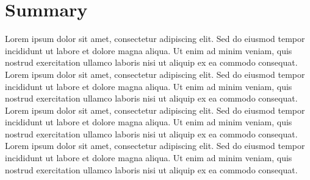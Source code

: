 \section{Summary}
\label{sec:Metho:closure}
%
%
Lorem ipsum dolor sit amet, consectetur adipiscing elit. 
Sed do eiusmod tempor incididunt ut labore et dolore magna aliqua. 
Ut enim ad minim veniam, quis nostrud exercitation ullamco laboris nisi ut aliquip ex ea commodo consequat.
Lorem ipsum dolor sit amet, consectetur adipiscing elit. 
Sed do eiusmod tempor incididunt ut labore et dolore magna aliqua. 
Ut enim ad minim veniam, quis nostrud exercitation ullamco laboris nisi ut aliquip ex ea commodo consequat.
Lorem ipsum dolor sit amet, consectetur adipiscing elit. 
Sed do eiusmod tempor incididunt ut labore et dolore magna aliqua. 
Ut enim ad minim veniam, quis nostrud exercitation ullamco laboris nisi ut aliquip ex ea commodo consequat.
Lorem ipsum dolor sit amet, consectetur adipiscing elit. 
Sed do eiusmod tempor incididunt ut labore et dolore magna aliqua. 
Ut enim ad minim veniam, quis nostrud exercitation ullamco laboris nisi ut aliquip ex ea commodo consequat.
%
%
